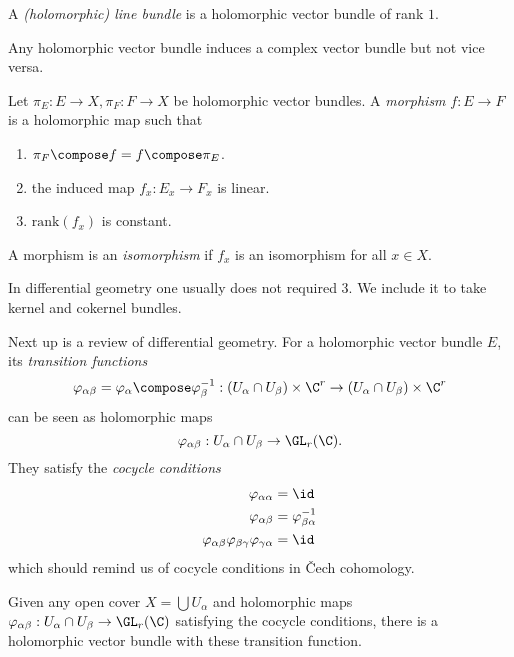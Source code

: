 \documentclass[a4paper]{article}
\begin{document}
\begin{definition}
  A \emph{(holomorphic) line bundle} is a holomorphic vector bundle of rank \(1\).
\end{definition}

Any holomorphic vector bundle induces a complex vector bundle but not vice versa.

\begin{definition}
  Let \(\pi_E: E \to X, \pi_F: F \to X\) be holomorphic vector bundles. A \emph{morphism} \(f: E \to F\) is a holomorphic map such that
  \begin{enumerate}
  \item \(\pi_F \compose f = f \compose \pi_E\).
  \item the induced map \(f_x: E_x \to F_x\) is linear.
  \item \(\text{rank}(f_x)\) is constant.
  \end{enumerate}

  A morphism is an \emph{isomorphism} if \(f_x\) is an isomorphism for all \(x \in X\).
\end{definition}

\begin{remark}
  In differential geometry one usually does not required 3. We include it to take kernel and cokernel bundles.
\end{remark}

Next up is a review of differential geometry. For a holomorphic vector bundle \(E\), its \emph{transition functions}
\[
  \varphi_{\alpha\beta} = \varphi_\alpha \compose \varphi_\beta^{-1}: (U_\alpha \cap U_\beta) \times \C^r \to (U_\alpha \cap U_\beta) \times \C^r 
\]
can be seen as holomorphic maps
\[
  \varphi_{\alpha\beta}: U_\alpha \cap U_\beta \to \GL_r(\C).
\]
They satisfy the \emph{cocycle conditions}
\begin{align*}
  \varphi_{\alpha\alpha} &= \id \\
  \varphi_{\alpha\beta} &= \varphi_{\beta\alpha}^{-1} \\
  \varphi_{\alpha\beta} \varphi_{\beta\gamma} \varphi_{\gamma\alpha} &= \id
\end{align*}
which should remind us of cocycle conditions in Čech cohomology.

\begin{proposition}
  Given any open cover \(X = \bigcup U_\alpha\) and holomorphic maps \(\varphi_{\alpha\beta}: U_\alpha \cap U_\beta \to \GL_r(\C)\) satisfying the cocycle conditions, there is a holomorphic vector bundle with these transition function.
\end{proposition}
\end{document}
